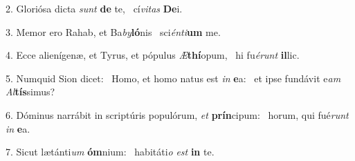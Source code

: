 2. Gloriósa dicta \textit{sunt} \textbf{de} te, \ast\  cí\textit{vi}\textit{tas} \textbf{De}i.\

3. Memor ero Rahab, et Ba\textit{by}\textbf{ló}nis \ast\  sci\textit{én}\textit{ti}\textbf{um} me.\

4. Ecce alienígenæ, et Tyrus, et pópulus \textit{Æ}\textbf{thí}opum, \ast\  hi fu\textit{é}\textit{runt} \textbf{il}lic.\

5. Numquid Sion dicet: \dag\  Homo, et homo natus est \textit{in} \textbf{e}a: \ast\  et ipse fundávit e\textit{am} \textit{Al}\textbf{tís}simus?\

6. Dóminus narrábit in scriptúris populórum, \textit{et} \textbf{prín}cipum: \ast\  horum, qui fué\textit{runt} \textit{in} \textbf{e}a.\

7. Sicut lætánti\textit{um} \textbf{óm}nium: \ast\  habitáti\textit{o} \textit{est} \textbf{in} te.\

